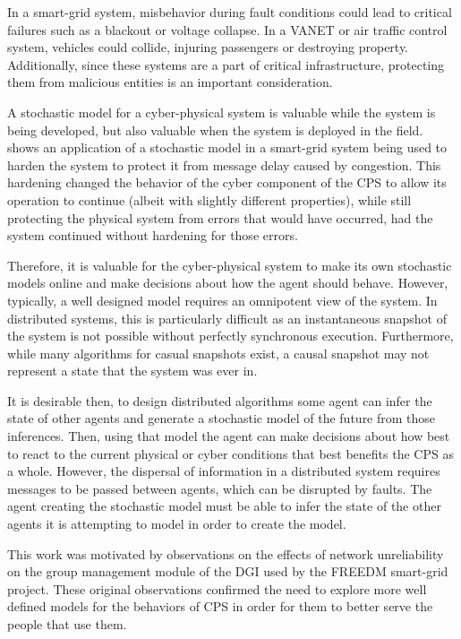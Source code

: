 In a smart-grid system, misbehavior during fault conditions could lead to critical failures such as a blackout or voltage collapse. In a \ac{VANET} or air traffic control system, vehicles could collide, injuring passengers or destroying property. Additionally, since these systems are a part of critical infrastructure, protecting them from malicious entities is an important consideration.

A stochastic model for a cyber-physical system is valuable while the system is being developed, but also valuable when the system is deployed in the field. \cite{safecomp-jackson} shows an application of a stochastic model in a smart-grid system being used to harden the system to protect it from message delay caused by congestion. This hardening changed the behavior of the cyber component of the \ac{CPS} to allow its operation to continue (albeit with slightly different properties), while still protecting the physical system from errors that would have occurred, had the system continued without hardening for those errors.

Therefore, it is valuable for the cyber-physical system to make its own stochastic models online and make decisions about how the agent should behave. However, typically, a well designed model requires an omnipotent view of the system. In distributed systems, this is particularly difficult as an instantaneous snapshot of the system is not possible without perfectly synchronous execution. Furthermore, while many algorithms for casual snapshots exist\cite{distributed-challenges}, a causal snapshot may not represent a state that the system was ever in.

It is desirable then, to design distributed algorithms some agent can infer the state of other agents and generate a stochastic model of the future from those inferences. Then, using that model the agent can make decisions about how best to react to the current physical or cyber conditions that best benefits the \ac{CPS} as a whole. However, the dispersal of information in a distributed system requires messages to be passed between agents, which can be disrupted by faults\cite{HARINI}. The agent creating the stochastic model must be able to infer the state of the other agents it is attempting to model in order to create the model.

This work was motivated by observations on the effects of network unreliability on the group management module of the \ac{DGI} used by the \ac{FREEDM} smart-grid project.
These original observations confirmed the need to explore more well defined models for the behaviors of \ac{CPS} in order for them to better serve the people that use them.

